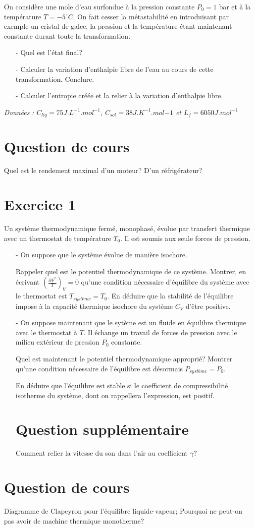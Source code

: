 \documentclass{report}
\begin{document}
On considère une mole d'eau surfondue à la pression constante $P_{0}=1$ bar et à la température $T=-5^{\circ}C$. On fait cesser la métastabilité en introduisant par exemple un cristal de galce, la pression et la température étant maintenant constante durant toute la transformation.
\begin{itemize}
\item[-]Quel est l'état final?
\item[-]Calculer la variation d'enthalpie libre de l'eau au cours de cette transformation. Conclure.
\item[-]Calculer l'entropie créée et la relier à la variation d'enthalpie libre.
\end{itemize}
\textit{Données : $C_{liq}=75J.L^{-1}.mol^{-1}$, $C_{sol}=38J.K^{-1}.mol{-1}$ et $L_{f} = 6050 J.mol^{-1}$}

\newpage

\section*{Question de cours}
Quel est le rendement maximal d'un moteur? D'un réfrigérateur?

\section*{Exercice 1}
Un système thermodynamique fermé, monophasé, évolue par transfert thermique avec un thermostat de température $T_{0}$. Il est soumis aux seule forces de pression.

\begin{itemize}
\item[-] On suppose que le système évolue de manière isochore.

Rappeler quel est le potentiel thermodynamique de ce système. Montrer, en écrivant $\left(  \frac{\partial F^{*}}{T}\right)_{V} = 0$ qu'une condition nécessaire d’équilibre du système avec le thermostat est $T_{système}=T_{0}$. 
En déduire que la stabilité de l'équilibre impose à la capacité thermique isochore du système $C_{V}$  d'être positive.
\item[-] On suppose maintenant que le sytème est un fluide en équilibre thermique avec le thermostat à $T$. Il échange un travail de forces de pression avec le milieu extérieur de pression $P_{0}$ constante.

Quel est maintenant le potentiel thermodynamique approprié?
Montrer qu'une condition nécessaire de l'équilibre est désormais $P_{système}=P_{0}$.

En déduire que l'équilibre est stable si le coefficient de compressibilité isotherme du système, dont on rappellera l'expression, est positif.

\section*{Question supplémentaire}

Comment relier la vitesse du son dans l'air au coefficient $\gamma$?
\end{itemize}

\newpage

\section*{Question de cours}
Diagramme de Clapeyron pour l'équilibre liquide-vapeur; Pourquoi ne peut-on pas avoir de machine thermique monotherme?
\end{document}
